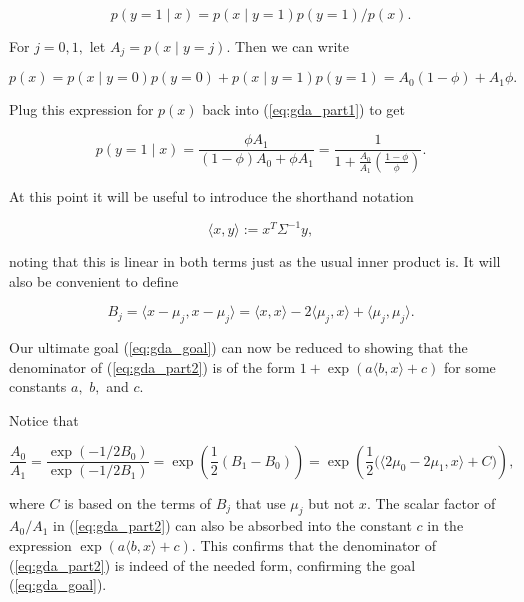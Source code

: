 \documentclass[]{article}
\begin{document}
\begin{equation}p(y=1\mid x) = p(x\mid y=1)p(y=1)/p(x).\label{eq:gda_part1}\end{equation}

For \(j=0,1,\) let \(A_j=p(x\mid y=j).\) Then we can write

\[p(x) = p(x\mid y=0)p(y=0) + p(x\mid y=1)p(y=1) = A_0(1-\phi) + A_1\phi.\]

Plug this expression for \(p(x)\) back into (\ref{eq:gda_part1}) to get

\begin{equation}p(y=1\mid x) = \frac{\phi A_1}{(1-\phi)A_0 + \phi A_1}
= \frac{1}{1 + \frac{A_0}{A_1}\left(\frac{1-\phi}{\phi}\right)}.\label{eq:gda_part2}\end{equation}

At this point it will be useful to introduce the shorthand notation

\[\langle x, y\rangle := x^T\Sigma^{-1}y,\]

noting that this is linear in both terms just as the usual inner product
is. It will also be convenient to define

\[B_j = \langle x-\mu_j, x-\mu_j\rangle
      = \langle x, x\rangle - 2\langle \mu_j,x\rangle + \langle \mu_j, \mu_j
      \rangle.\]

Our ultimate goal (\ref{eq:gda_goal}) can now be reduced to showing that
the denominator of (\ref{eq:gda_part2}) is of the form
\(1 + \exp(a\langle b,x\rangle + c)\) for some constants \(a,\) \(b,\)
and \(c.\)

Notice that

\[\frac{A_0}{A_1} = \frac{\exp(-1/2 B_0)}{\exp(-1/2 B_1)}
   = \exp\left(\frac{1}{2}(B_1-B_0)\right)
   = \exp\left(\frac{1}{2}\big(\langle 2\mu_0 - 2\mu_1, x\rangle+C\big)\right),\]

where \(C\) is based on the terms of \(B_j\) that use \(\mu_j\) but not
\(x.\) The scalar factor of \(A_0/A_1\) in (\ref{eq:gda_part2}) can also
be absorbed into the constant \(c\) in the expression
\(\exp(a\langle b, x\rangle + c).\) This confirms that the denominator
of (\ref{eq:gda_part2}) is indeed of the needed form, confirming the
goal (\ref{eq:gda_goal}).

\hypertarget{refs}{}
\end{document}
